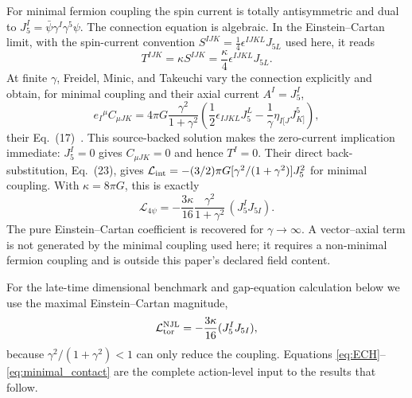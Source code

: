 \documentclass[aps,prd,twocolumn,superscriptaddress,showpacs,preprintnumbers,nofootinbib,longbibliography,floatfix]{revtex4-2}
\begin{document}
For minimal fermion coupling the spin current is totally antisymmetric and
dual to $J_5^I=\bar\psi\gamma^I\gamma^5\psi$.  The connection equation is
algebraic.  In the Einstein--Cartan limit, with the spin-current convention
$S^{IJK}=\tfrac14\epsilon^{IJKL}J_{5L}$ used here, it reads
\begin{equation}\label{eq:torsion}
T^{IJK}=\kappa S^{IJK}=\frac{\kappa}{4}\epsilon^{IJKL}J_{5L}.
\end{equation}
At finite $\gamma$, Freidel, Minic, and Takeuchi vary the connection explicitly
and obtain, for minimal coupling and their axial current $A^I=J_5^I$,
\begin{equation}\label{eq:fmt_contorsion}
e_I{}^\mu C_{\mu JK}=4\pi G\frac{\gamma^2}{1+\gamma^2}
\left(\frac12\epsilon_{IJKL}J_5^L
-\frac1\gamma\eta_{I[J}J^5_{K]}\right),
\end{equation}
their Eq.~(17)~\cite{Freidel2005}.  This source-backed solution makes the
zero-current implication immediate: $J_5^I=0$ gives $C_{\mu JK}=0$ and hence
$T^I=0$.  Their direct back-substitution, Eq.~(23), gives
$\mathcal L_{\rm int}=-(3/2)\pi G[\gamma^2/(1+\gamma^2)]J_5^2$ for minimal
coupling.  With $\kappa=8\pi G$, this is exactly
\begin{equation}\label{eq:4fermi}
\mathcal L_{4\psi}=-\frac{3\kappa}{16}
\frac{\gamma^2}{1+\gamma^2}\,(J_5^I J_{5I}).
\end{equation}
The pure Einstein--Cartan coefficient is recovered for
$\gamma\rightarrow\infty$.  A vector--axial term is not generated by the
minimal coupling used here; it requires a non-minimal fermion coupling and is
outside this paper's declared field content.

For the late-time dimensional benchmark and gap-equation calculation below we use the
maximal Einstein--Cartan magnitude,
\begin{equation}\label{eq:minimal_contact}
\mathcal L^{\rm NJL}_{\rm tor}=-\frac{3\kappa}{16}(J_5^I J_{5I}),
\end{equation}
because $\gamma^2/(1+\gamma^2)<1$ can only reduce the coupling.  Equations
\eqref{eq:ECH}--\eqref{eq:minimal_contact} are the complete action-level input to
the results that follow.
\end{document}
